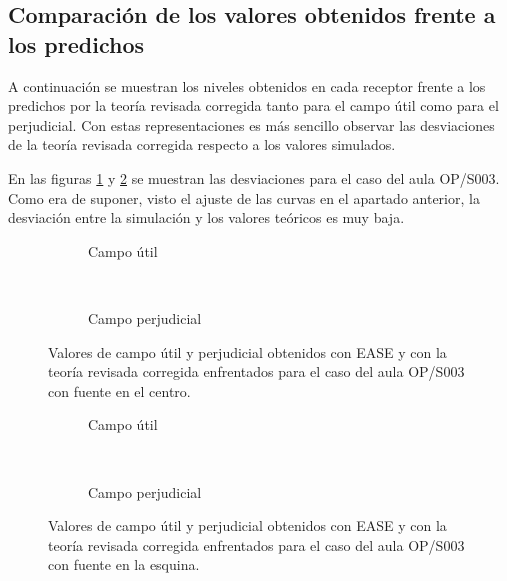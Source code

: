 \subsection{Comparación de los valores obtenidos frente a los predichos}

A continuación se muestran los niveles obtenidos en cada receptor frente a los predichos por la teoría revisada corregida tanto para el campo útil como para el perjudicial. Con estas representaciones es más sencillo observar las desviaciones de la teoría revisada corregida respecto a los valores simulados.

En las figuras \ref{graf:predictoresopticacentro}  y \ref{graf:predictoresopticaesquina} se muestran las desviaciones para el caso del aula OP/S003. Como era de suponer, visto el ajuste de las curvas en el apartado anterior, la desviación entre la simulación y los valores teóricos es muy baja.


\begin{figure}[ht]
\centering%
    \begin{subfigure}[b]{0.4\textwidth}
    	\centering%
         {%
    }
    \caption{Campo útil}%
    \end{subfigure}%
    ~
    \begin{subfigure}[b]{0.4\textwidth}%
    	\centering%
        {%
    }
    \caption{Campo perjudicial}%
    \end{subfigure}
    \caption{Valores de campo útil y perjudicial obtenidos con EASE y con la teoría revisada corregida enfrentados para el caso del aula OP/S003 con fuente en el centro.}
\label{graf:predictoresopticacentro}%
\end{figure}
\FloatBarrier 

\begin{figure}[ht]
\centering%
    \begin{subfigure}[b]{0.4\textwidth}
    	\centering%
         {%
    }
    \caption{Campo útil}%
    \end{subfigure}%
    ~
    \begin{subfigure}[b]{0.4\textwidth}%
    	\centering%
        {%
    }
    \caption{Campo perjudicial}%
    \end{subfigure}
    \caption{Valores de campo útil y perjudicial obtenidos con EASE y con la teoría revisada corregida enfrentados para el caso del aula OP/S003 con fuente en la esquina.}
\label{graf:predictoresopticaesquina}%
\end{figure}
\FloatBarrier 


